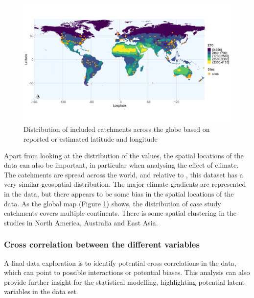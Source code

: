 \documentclass[]{elsarticle} %
\begin{document}
\begin{figure}
\includegraphics[width=0.9\linewidth]{FAOET0data_final_2022} \caption{Distribution of included catchments across the globe based on reported or estimated latitude and longitude}\label{fig:globalmap}
\end{figure}

Apart from looking at the distribution of the values, the spatial locations of the data can also be important, in particular when analysing the effect of climate. The catchments are spread across the world, and relative to \citet{zhang2017}, this dataset has a very similar geospatial distribution. The major climate gradients are represented in the data, but there appears to be some bias in the spatial locations of the data. As the global map (Figure \ref{fig:globalmap}) shows, the distribution of case study catchments covers multiple continents. There is some spatial clustering in the studies in North America, Australia and East Asia.

\hypertarget{cross-correlation-between-the-different-variables}{%
\subsubsection{Cross correlation between the different variables}\label{cross-correlation-between-the-different-variables}}

A final data exploration is to identify potential cross correlations in the data, which can point to possible interactions or potential biases. This analysis can also provide further insight for the statistical modelling, highlighting potential latent variables in the data set.
\end{document}
